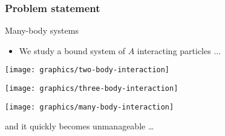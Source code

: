 \begin{frame}[fragile]
    \frametitle{Problem statement}

    \begin{block}{Many-body systems}
    \begin{itemize}
    \item We study a bound system of $A$ interacting particles ...
    \end{itemize}
    \end{block}

\begin{center}
\parbox{0.3\textwidth}{\texttt{[image: graphics/two-body-interaction]}}
\parbox{0.3\textwidth}{\texttt{[image: graphics/three-body-interaction]}}
\parbox{0.3\textwidth}{\texttt{[image: graphics/many-body-interaction]}}
\end{center}
\begin{center}
and it quickly becomes unmanageable \ldots
\end{center}
\end{frame}


